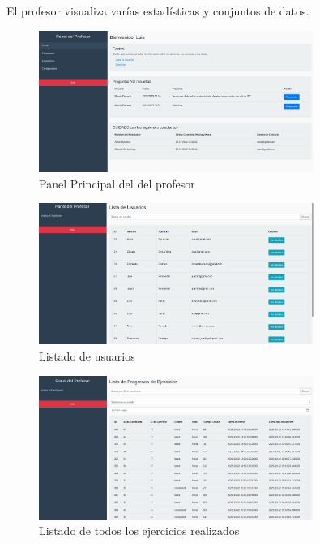 \begin{appendices}
El profesor visualiza varías estadísticas y conjuntos de datos. 

\begin{figure}[H]
    \centering
    \includegraphics[width=0.8\textwidth]{imagenes/Manual/panelcontrol.png}
    \caption{Panel Principal del del profesor}
\end{figure}

\begin{figure}[H]
    \centering
    \includegraphics[width=0.8\textwidth]{imagenes/Manual/listausuarios.png}
    \caption{Listado de usuarios}
\end{figure}

\begin{figure}[H]
    \centering
    \includegraphics[width=0.8\textwidth]{imagenes/Manual/listaprogresos.png}
    \caption{Listado de todos los ejercicios realizados}
\end{figure}


\end{appendices}
